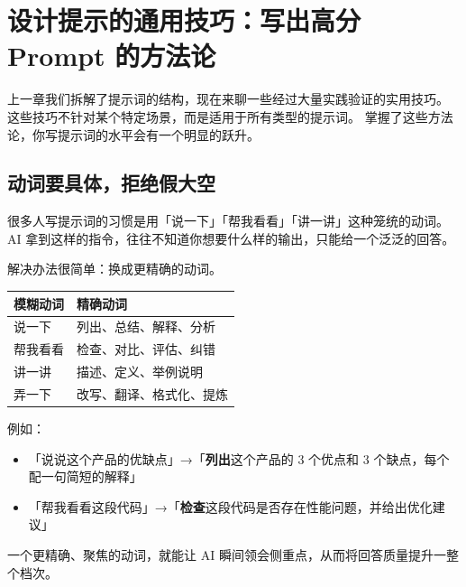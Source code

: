 % 
% 


\chapter{设计提示的通用技巧：写出高分 Prompt 的方法论}
\label{ch:general-tips}

上一章我们拆解了提示词的结构，现在来聊一些经过大量实践验证的实用技巧。
这些技巧不针对某个特定场景，而是适用于所有类型的提示词。
掌握了这些方法论，你写提示词的水平会有一个明显的跃升。

\section{动词要具体，拒绝假大空}

很多人写提示词的习惯是用「说一下」「帮我看看」「讲一讲」这种笼统的动词。AI 拿到这样的指令，往往不知道你想要什么样的输出，只能给一个泛泛的回答。

解决办法很简单：换成更精确的动词。

\begin{center}
\begin{tabular}{ll}
  \toprule
  \textbf{模糊动词} & \textbf{精确动词} \\
  \midrule
  说一下 & 列出、总结、解释、分析 \\
  帮我看看 & 检查、对比、评估、纠错 \\
  讲一讲 & 描述、定义、举例说明 \\
  弄一下 & 改写、翻译、格式化、提炼 \\
  \bottomrule
\end{tabular}
\end{center}

例如：

\begin{itemize}
  \item 「说说这个产品的优缺点」→「\textbf{列出}这个产品的 3 个优点和 3 个缺点，每个配一句简短的解释」
  \item 「帮我看看这段代码」→「\textbf{检查}这段代码是否存在性能问题，并给出优化建议」
\end{itemize}

一个更精确、聚焦的动词，就能让 AI 瞬间领会侧重点，从而将回答质量提升一整个档次。

